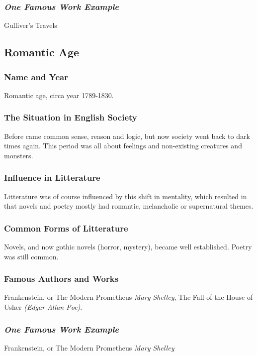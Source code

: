 \subsubsection{\textit{One Famous Work Example}}
Gulliver's Travels

\newpage
\subsection{Romantic Age}

\subsubsection{Name and Year}
Romantic age, circa year 1789-1830.

\subsubsection{The Situation in English Society}
Before came common sense, reason and logic, but now society went back to dark times again. This period was all about feelings and non-existing creatures and monsters.

\subsubsection{Influence in Litterature}
Litterature was of course influenced by this shift in mentality, which resulted in that novels and poetry mostly had romantic, melancholic or supernatural themes.

\subsubsection{Common Forms of Litterature}
Novels, and now gothic novels (horror, mystery), became well established. Poetry was still common.

\subsubsection{Famous Authors and Works}
Frankenstein, or The Modern Prometheus \textit{Mary Shelley}, The Fall of the House of Usher \textit{(Edgar Allan Poe)}.


\subsubsection{\textit{One Famous Work Example}}
Frankenstein, or The Modern Prometheus \textit{Mary Shelley}

